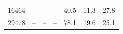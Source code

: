 \begin{tabular}{r | r r r | r r r}
         16464  &              --  &              --  &              --  &      \num{40.5}  &      \num{11.3}  &      \num{27.8} \\ 
         29478  &              --  &              --  &              --  &      \num{78.1}  &      \num{19.6}  &      \num{25.1} \\ 
\bottomrule
\end{tabular}
